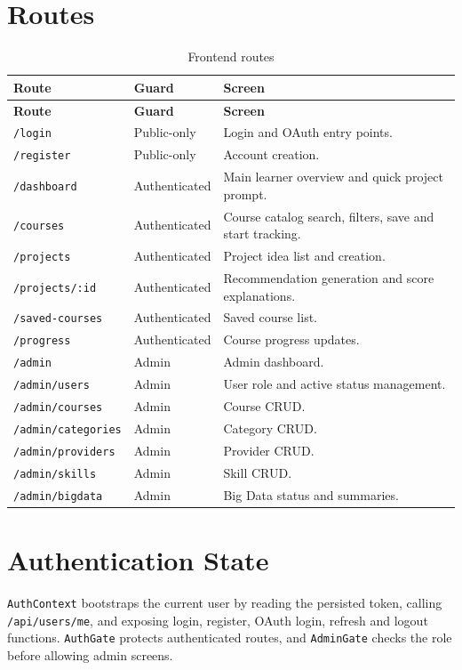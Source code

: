 \documentclass[12pt,a4paper]{report}
\begin{document}
\section{Routes}
\begin{longtable}{p{}p{}p{}}
\caption{Frontend routes}\\
\toprule
\textbf{Route} & \textbf{Guard} & \textbf{Screen}\\
\midrule
\endfirsthead
\toprule
\textbf{Route} & \textbf{Guard} & \textbf{Screen}\\
\midrule
\endhead
\texttt{/login} & Public-only & Login and OAuth entry points.\\
\texttt{/register} & Public-only & Account creation.\\
\texttt{/dashboard} & Authenticated & Main learner overview and quick project prompt.\\
\texttt{/courses} & Authenticated & Course catalog search, filters, save and start tracking.\\
\texttt{/projects} & Authenticated & Project idea list and creation.\\
\texttt{/projects/:id} & Authenticated & Recommendation generation and score explanations.\\
\texttt{/saved-courses} & Authenticated & Saved course list.\\
\texttt{/progress} & Authenticated & Course progress updates.\\
\texttt{/admin} & Admin & Admin dashboard.\\
\texttt{/admin/users} & Admin & User role and active status management.\\
\texttt{/admin/courses} & Admin & Course CRUD.\\
\texttt{/admin/categories} & Admin & Category CRUD.\\
\texttt{/admin/providers} & Admin & Provider CRUD.\\
\texttt{/admin/skills} & Admin & Skill CRUD.\\
\texttt{/admin/bigdata} & Admin & Big Data status and summaries.\\
\bottomrule
\end{longtable}

\section{Authentication State}
\texttt{AuthContext} bootstraps the current user by reading the persisted token, calling \texttt{/api/users/me}, and exposing login, register, OAuth login, refresh and logout functions. \texttt{AuthGate} protects authenticated routes, and \texttt{AdminGate} checks the role before allowing admin screens.
\end{document}
